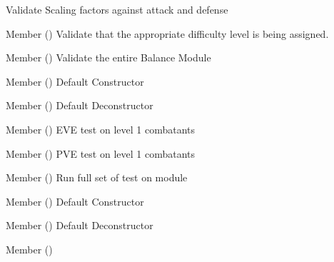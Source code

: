 \begin{DoxyRefList}
%
Validate Scaling factors against attack and defense  
\item[Member \doxylink{class_test_balance_a9221086b724b0d24f0d96a903f98adda}{Test\+Balance\+::difficulty\+\_\+level} ()]\label{todo__todo000215}%
%
Validate that the appropriate difficulty level is being assigned.  
\item[Member \doxylink{class_test_balance_a80d8b0affa58a2c70d90cbf2bac8c517}{Test\+Balance\+::test\+\_\+all} ()]\label{todo__todo000213}%
%
Validate the entire Balance Module  
\item[Member \doxylink{class_test_balance_a0b015a3d015cf1931552d46e19ac9734}{Test\+Balance\+::Test\+Balance} ()]\label{todo__todo000212}%
%
Default Constructor  
\item[Member \doxylink{class_test_balance_a4c8c816b787fa576d8112b6677f5c27e}{Test\+Balance\+::\texorpdfstring{$\sim$}{\string~}\+Test\+Balance} ()]\label{todo__todo000216}%
%
Default Deconstructor  
\item[Member \doxylink{class_test_battle_a9233317fdb07fb927f83c22b811e4d9b}{Test\+Battle\+::level1\+\_\+eve} ()]\label{todo__todo000222}%
%
EVE  test on level 1 combatants  
\item[Member \doxylink{class_test_battle_a2f2a420d04a578451c15675444f8a8e5}{Test\+Battle\+::level1\+\_\+pve} ()]\label{todo__todo000223}%
%
PVE  test on level 1 combatants  
\item[Member \doxylink{class_test_battle_a5b4d4bfb476dea566db72367d80521a6}{Test\+Battle\+::test\+\_\+all} ()]\label{todo__todo000221}%
%
Run full set of test on module  
\item[Member \doxylink{class_test_battle_a4db7924af5371bb557e285897542c073}{Test\+Battle\+::Test\+Battle} ()]\label{todo__todo000220}%
%
Default Constructor  
\item[Member \doxylink{class_test_battle_aebe76605d0317113192acc262fa6371b}{Test\+Battle\+::\texorpdfstring{$\sim$}{\string~}\+Test\+Battle} ()]\label{todo__todo000224}%
%
Default Deconstructor  
\item[Member \doxylink{class_test_ciphers_a68c1d7f7043a395e8e960b11cb22dff0}{Test\+Ciphers\+::decode} ()]\label{todo__todo000228}%
%

\end{DoxyRefList}
